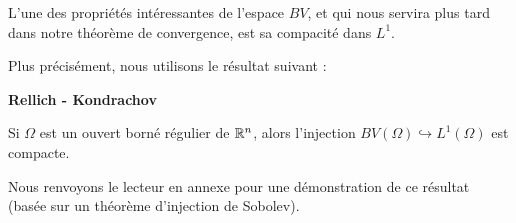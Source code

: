 L'une des propriétés intéressantes de l'espace $BV$, et qui nous servira plus tard dans notre théorème de convergence, est sa compacité dans $L^1$. 

Plus précisément, nous utilisons le résultat suivant :



    


    



\begin{theorembox}
\begin{theorem}
    \textbf{Rellich - Kondrachov} \cite{Evans}

    Si $\Omega$ est un ouvert borné régulier de $\mathbb{R}^n$, alors l'injection $BV(\Omega) \hookrightarrow L^1(\Omega)$ est compacte.
\end{theorem}
\end{theorembox}

Nous renvoyons le lecteur en annexe pour une démonstration de ce résultat (basée sur un théorème d'injection de Sobolev).

